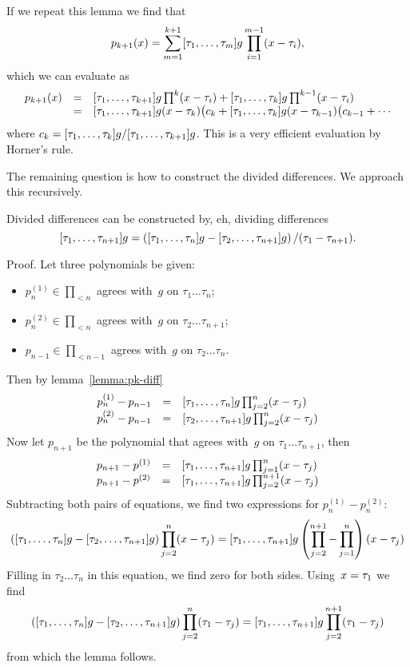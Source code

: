 If we repeat this lemma we find that 
\begin{equation}
    p_{k+1}(x)=\sum_{m=1}^{k+1}[\tau_{1},\ldots,\tau_{m}]g\prod_{i=1}^{m-1}(x-\tau_i),
    \label{eq:p-sum-diffs}
\end{equation}
which we can evaluate as 
\[
\begin{array}{rcl}
 p_{k+1}(x) &=&
 [\tau_{1},\ldots,\tau_{k+1}]g\prod^k(x-\tau_i)+[\tau_{1},\ldots,\tau_{k}]g\prod^{k-1}(x-\tau_i)\\
    &=&[\tau_{1},\ldots,\tau_{k+1}]g(x-\tau_k)\bigl(c_k
                +[\tau_{1},\ldots,\tau_{k}]g(x-\tau_{k-1})\bigl(c_{k-1}+\cdots
\end{array}
\]
where $c_k=[\tau_{1},\ldots,\tau_{k}]g/[\tau_{1},\ldots,\tau_{k+1}]g$. This is a very efficient evaluation
by Horner's rule. 

The remaining question is how to construct the
divided differences. We approach this recursively.
\begin{lemma}\label{lemma:divdiff-construct}
Divided differences can be constructed by, eh, dividing differences
\begin{equation}
    [\tau_{1},\ldots,\tau_{n+1}]g=\left([\tau_{1},\ldots,\tau_{n}]g-[\tau_{2},\ldots,\tau_{n+1}]g\right)/(\tau_1-\tau_{n+1}).
    \label{eq:div-diff}
\end{equation}
\end{lemma}
Proof. Let three polynomials be given:
\begin{itemize}
\item $p^{(1)}_n\in\prod_{<n}$ agrees with~$g$ on
  $\tau_1\ldots\tau_n$;
\item $p^{(2)}_n\in\prod_{<n}$ agrees with~$g$ on
  $\tau_2\ldots\tau_{n+1}$;
\item $p_{n-1}\in\prod_{<n-1}$ agrees with~$g$ on
  $\tau_2\ldots\tau_n$.
\end{itemize}
Then by lemma~\ref{lemma:pk-diff}
\[ \begin{array}{rcl}
  p^{(1)}_n-p_{n-1}&=&[\tau_{1},\ldots,\tau_{n}]g\prod_{j=2}^n(x-\tau_j)\\
  p^{(2)}_n-p_{n-1}&=&[\tau_{2},\ldots,\tau_{n+1}]g\prod_{j=2}^n(x-\tau_j)
\end{array} \]
Now let $p_{n+1}$ be the polynomial that agrees with~$g$ on
$\tau_1\ldots\tau_{n+1}$, then
\[ \begin{array}{rcl}
  p_{n+1}-p^{(1)}&=&[\tau_{1},\ldots,\tau_{n+1}]g\prod_{j=1}^n(x-\tau_j)\\
  p_{n+1}-p^{(2)}&=&[\tau_{1},\ldots,\tau_{n+1}]g\prod_{j=2}^{n+1}(x-\tau_j)
\end{array} \]
Subtracting both pairs of equations, we find two expressions for
$p^{(1)}_n-p^{(2)}_n$:
\[ \left([\tau_{1},\ldots,\tau_{n}]g-[\tau_{2},\ldots,\tau_{n+1}]g\right)\prod_{j=2}^n(x-\tau_j)
  = [\tau_{1},\ldots,\tau_{n+1}]g\left(\prod_{j=2}^{n+1}-\prod_{j=1}^n\right)
        (x-\tau_j)
\] 
Filling in $\tau_2\ldots\tau_n$ in this equation, we find zero for
both sides. Using~$x=\nobreak\tau_1$ we find
\[ \left([\tau_{1},\ldots,\tau_{n}]g-[\tau_{2},\ldots,\tau_{n+1}]g\right)\prod_{j=2}^n(\tau_1-\tau_j)
  = [\tau_{1},\ldots,\tau_{n+1}]g\prod_{j=2}^{n+1}(\tau_1-\tau_j)
\]
from which the lemma follows.\endproof

